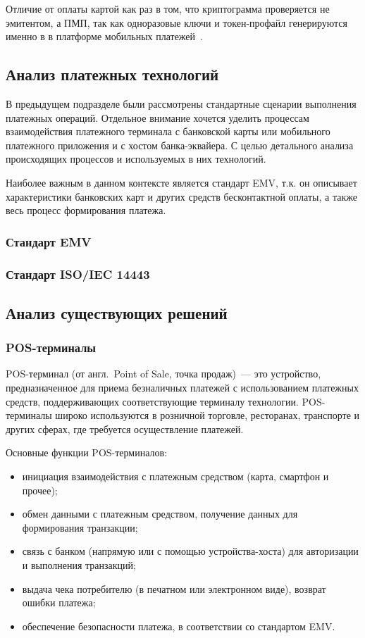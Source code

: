 Отличие от оплаты картой как раз в том, что криптограмма проверяется не эмитентом, а ПМП, так как одноразовые ключи и токен-профайл генерируются именно в в платформе мобильных платежей~\cite{habr_nspk_mir_payment}.


\subsection{Анализ платежных технологий}

В предыдущем подразделе были рассмотрены стандартные сценарии выполнения платежных операций.
Отдельное внимание хочется уделить процессам взаимодействия платежного терминала с банковской карты или мобильного платежного приложения и с хостом банка-эквайера.
С целью детального анализа происходящих процессов и используемых в них технологий.

Наиболее важным в данном контексте является стандарт EMV, т.к. он описывает характеристики банковских карт и других средств бесконтактной оплаты, а также весь процесс формирования платежа.

\subsubsection{Стандарт EMV}

\subsubsection{Стандарт ISO/IEC 14443}



\subsection{Анализ существующих решений}

\subsubsection{POS-терминалы}

POS-терминал (от англ.\ Point of Sale, точка продаж)~--- это устройство, предназначенное для приема безналичных платежей с использованием платежных средств, поддерживающих соответствующие терминалу технологии.
POS-терминалы широко используются в розничной торговле, ресторанах, транспорте и других сферах, где требуется осуществление платежей.

Основные функции POS-терминалов:

\begin{itemize}
    \item инициация взаимодействия с платежным средством (карта, смартфон и прочее);
    \item обмен данными с платежным средством, получение данных для формирования транзакции;
    \item связь с банком (напрямую или с помощью устройства-хоста) для авторизации и выполнения транзакций;
    \item выдача чека потребителю (в печатном или электронном виде), возврат ошибки платежа;
    \item обеспечение безопасности платежа, в соответствии со стандартом EMV.
\end{itemize}

